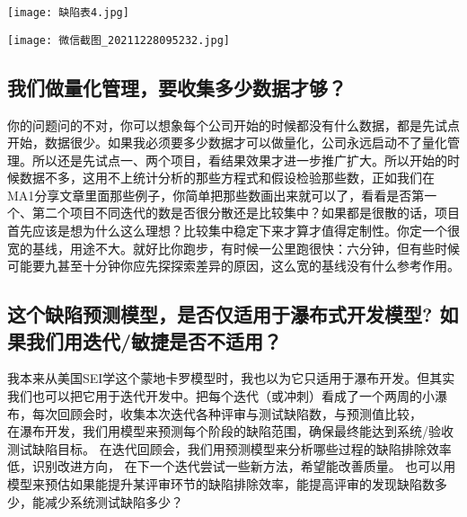 \texttt{[image: 缺陷表4.jpg]}


\texttt{[image: 微信截图\_20211228095232.jpg]}

\hypertarget{ux6211ux4eecux505aux91cfux5316ux7ba1ux7406ux8981ux6536ux96c6ux591aux5c11ux6570ux636eux624dux591f}{%
\subsection{我们做量化管理，要收集多少数据才够？}\label{ux6211ux4eecux505aux91cfux5316ux7ba1ux7406ux8981ux6536ux96c6ux591aux5c11ux6570ux636eux624dux591f}}

你的问题问的不对，你可以想象每个公司开始的时候都没有什么数据，都是先试点开始，数据很少。如果我必须要多少数据才可以做量化，公司永远启动不了量化管理。所以还是先试点一、两个项目，看结果效果才进一步推广扩大。所以开始的时候数据不多，这用不上统计分析的那些方程式和假设检验那些数，正如我们在MA1分享文章里面那些例子，你简单把那些数画出来就可以了，看看是否第一个、第二个项目不同迭代的数是否很分散还是比较集中？如果都是很散的话，项目首先应该是想为什么这么理想？比较集中稳定下来才算才值得定制性。你定一个很宽的基线，用途不大。就好比你跑步，有时候一公里跑很快：六分钟，但有些时候可能要九甚至十分钟你应先探探索差异的原因，这么宽的基线没有什么参考作用。

\hypertarget{ux8fd9ux4e2aux7f3aux9677ux9884ux6d4bux6a21ux578bux662fux5426ux4ec5ux9002ux7528ux4e8eux7011ux5e03ux5f0fux5f00ux53d1ux6a21ux578b-ux5982ux679cux6211ux4eecux7528ux8fedux4ee3ux654fux6377ux662fux5426ux4e0dux9002ux7528}{%
\subsection{这个缺陷预测模型，是否仅适用于瀑布式开发模型?
如果我们用迭代/敏捷是否不适用？}\label{ux8fd9ux4e2aux7f3aux9677ux9884ux6d4bux6a21ux578bux662fux5426ux4ec5ux9002ux7528ux4e8eux7011ux5e03ux5f0fux5f00ux53d1ux6a21ux578b-ux5982ux679cux6211ux4eecux7528ux8fedux4ee3ux654fux6377ux662fux5426ux4e0dux9002ux7528}}

我本来从美国SEI学这个蒙地卡罗模型时，我也以为它只适用于瀑布开发。但其实我们也可以把它用于迭代开发中。把每个迭代（或冲刺）看成了一个两周的小瀑布，每次回顾会时，收集本次迭代各种评审与测试缺陷数，与预测值比较，\\
在瀑布开发，我们用模型来预测每个阶段的缺陷范围，确保最终能达到系统/验收测试缺陷目标。
在迭代回顾会，我们用预测模型来分析哪些过程的缺陷排除效率低，识别改进方向，
在下一个迭代尝试一些新方法，希望能改善质量。
也可以用模型来预估如果能提升某评审环节的缺陷排除效率，能提高评审的发现缺陷数多少，能减少系统测试缺陷多少？

